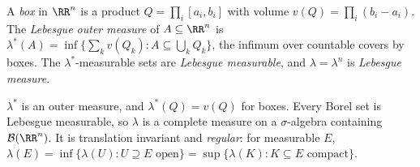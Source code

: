 \begin{definition}\label{measure-theory:definition-lebesgue}
A \emph{box} in $\RR^n$ is a product $Q = \prod_i[a_i, b_i]$ with volume $v(Q) = \prod_i(b_i - a_i)$. The \emph{Lebesgue outer measure} of $A \subseteq \RR^n$ is
$\lambda^*(A) = \inf\{\sum_kv(Q_k) : A \subseteq \bigcup_kQ_k\}$, the infimum over countable covers by boxes. The $\lambda^*$-measurable sets are \emph{Lebesgue measurable}, and $\lambda = \lambda^n$ is
\emph{Lebesgue measure}.
\end{definition}

\begin{theorem}\label{measure-theory:theorem-lebesgue-measure}
$\lambda^*$ is an outer measure, and $\lambda^*(Q) = v(Q)$ for boxes. Every Borel set is Lebesgue measurable, so $\lambda$ is a complete measure on a $\sigma$-algebra containing $\mathcal{B}(\RR^n)$. It is
translation invariant and \emph{regular}: for measurable $E$, $\lambda(E) = \inf\{\lambda(U) : U \supseteq E \text{ open}\} = \sup\{\lambda(K) : K \subseteq E \text{ compact}\}$.
\end{theorem}

